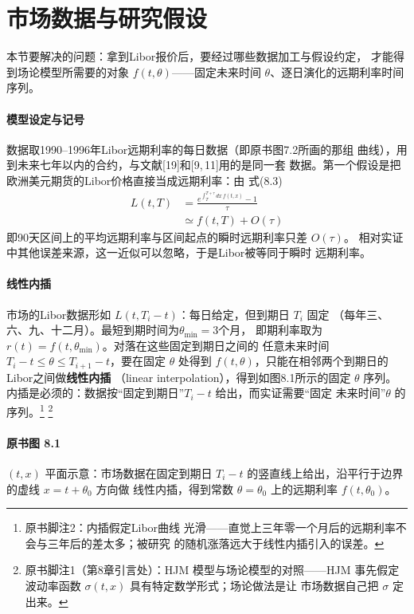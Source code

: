 \section{市场数据与研究假设}

本节要解决的问题：拿到Libor报价后，要经过哪些数据加工与假设约定，
才能得到场论模型所需要的对象 $f(t,\theta)$——固定未来时间
$\theta$、逐日演化的远期利率时间序列。

\paragraph{模型设定与记号}
数据取1990--1996年Libor远期利率的每日数据（即原书图7.2所画的那组
曲线），用到未来七年以内的合约，与文献[19]和[9,\,11]用的是同一套
数据。第一个假设是把欧洲美元期货的Libor价格直接当成远期利率：由
式(8.3)
\begin{align*}
L(t,T)&=\frac{e^{\int_{T}^{T+\tau}dx\,f(t,x)}-1}{\tau}
\tag{8.4}\\
&\simeq f(t,T)+O(\tau)
\tag{8.5}
\end{align*}
即90天区间上的平均远期利率与区间起点的瞬时远期利率只差 $O(\tau)$。
相对实证中其他误差来源，这一近似可以忽略，于是Libor被等同于瞬时
远期利率。

\paragraph{线性内插}
市场的Libor数据形如 $L(t,T_i-t)$：每日给定，但到期日 $T_i$ 固定
（每年三、六、九、十二月）。最短到期时间为$\theta_{\min}=3$个月，
即期利率取为$r(t)=f(t,\theta_{\min})$。对落在这些固定到期日之间的
任意未来时间
$T_i-t\le\theta\le T_{i+1}-t$，要在固定 $\theta$ 处得到
$f(t,\theta)$，只能在相邻两个到期日的Libor之间做\textbf{线性内插}
（linear interpolation），得到如图8.1所示的固定 $\theta$ 序列。
内插是必须的：数据按“固定到期日”$T_i-t$ 给出，而实证需要“固定
未来时间”$\theta$ 的序列。\footnote{原书脚注2：内插假定Libor曲线
光滑——直觉上三年零一个月后的远期利率不会与三年后的差太多；被研究
的随机涨落远大于线性内插引入的误差。}
\footnote{原书脚注1（第8章引言处）：HJM 模型与场论模型的对照——HJM
事先假定波动率函数 $\sigma(t,x)$ 具有特定数学形式；场论做法是让
市场数据自己把 $\sigma$ 定出来。}
\paragraph{原书图 8.1}\quad $(t,x)$ 平面示意：市场数据在固定到期日
$T_i-t$ 的竖直线上给出，沿平行于边界的虚线 $x=t+\theta_0$ 方向做
线性内插，得到常数 $\theta=\theta_0$ 上的远期利率 $f(t,\theta_0)$。

